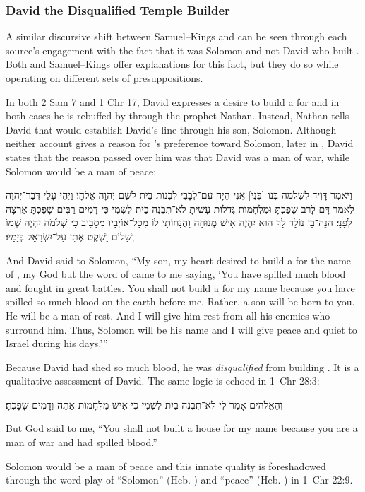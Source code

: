 \subsubsection{David the Disqualified Temple Builder}
A similar discursive shift between Samuel--Kings and \chronicles can be seen through each source's engagement with the fact that it was Solomon and not David who built \thetemple. Both \chronicles and Samuel--Kings offer explanations for this fact, but they do so while operating on different sets of presuppositions. 

In both 2 Sam 7 and 1 Chr 17, David expresses a desire to build a \temple for \yahweh and in both cases he is rebuffed by \yahweh through the prophet Nathan. Instead, Nathan tells David that \yahweh would establish David's line through his son, Solomon. Although neither account gives a reason for \yahweh's preference toward Solomon, later in \chronicles, David states that the reason \yahweh passed over him was that David was a man of war, while Solomon would be a man of peace:
\begin{hebrewtext}
    וַיֹּאמֶר דָּוִיד לִשְׁלֹמֹה בְּנוֹ [בְּנִי] אֲנִי הָיָה עִם־לְבָבִי לִבְנוֹת בַּיִת לְשֵׁם יְהוָה אֱלֹהָי׃ 
    וַיְהִי עָלַי דְּבַר־יְהוָה לֵאמֹר דָּם לָרֹב שָׁפַכְתָּ וּמִלְחָמוֹת גְּדֹלוֹת עָשִׂיתָ לֹא־תִבְנֶה בַיִת לִשְׁמִי כִּי דָּמִים רַבִּים שָׁפַכְתָּ אַרְצָה לְפָנָי׃
    הִנֵּה־בֵן נוֹלָד לָךְ הוּא יִהְיֶה אִישׁ מְנוּחָה וַהֲנִחוֹתִי לוֹ מִכָּל־אוֹיְבָיו מִסָּבִיב כִּי שְׁלֹמֹה יִהְיֶה שְׁמוֹ וְשָׁלוֹם וָשֶׁקֶט אֶתֵּן עַל־יִשְׂרָאֵל בְּיָמָיו׃
\end{hebrewtext}
\begin{translation}
    And David said to Solomon, ``My son, my heart desired to build a \temple for the name of \yahweh, my God
    but the word of \yahweh came to me saying, `You have spilled much blood and fought in great battles. You shall not build a \temple for my name because you have spilled so much blood on the earth before me.
    Rather, a son will be born to you. He will be a man of rest. And I will give him rest from all his enemies who surround him. Thus, Solomon will be his name and I will give peace and quiet to Israel during his days.'''
\end{translation}
\noindent
Because David had shed so much blood, he was \emph{disqualified} from building \thetemple. It is a qualitative assessment of David. The same logic is echoed in 1~Chr 28:3: 
\begin{hebrewtext}
    וְהָאֱלֹהִים אָמַר לִי לֹא־תִבְנֶה בַיִת לִשְׁמִי כִּי אִישׁ מִלְחָמוֹת אַתָּה וְדָמִים שָׁפָכְתָּ׃
\end{hebrewtext}
\begin{translation}
    But God said to me, ``You shall not built a house for my name because you are a man of war and had spilled blood.''
\end{translation}
\noindent
Solomon would be a man of peace and this innate quality is foreshadowed through the word-play of ``Solomon'' (Heb. ) and ``peace'' (Heb. ) in 1~Chr 22:9.

